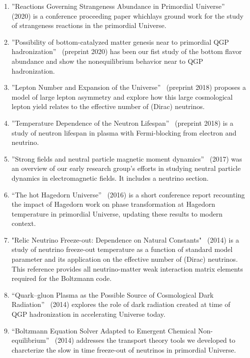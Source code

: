 \begin{enumerate}
%
\item ''Reactions Governing Strangeness Abundance in Primordial Universe''~\cite{Rafelski:2020ajx}  (2020) is a conference proceeding paper whichlays ground work for the study of strangeness reactions in the primordial Universe. 
%
\item''Possibility of bottom-catalyzed matter genesis near to primordial QGP hadronization''~\cite{Yang:2020nne} (preprint 2020) has been our fist study of the bottom flavor abundance and show the  nonequilibrium behavior near to QGP hadronization. 
%
\item ''Lepton Number and Expansion of the Universe''~\cite{Yang:2018oqg} (preprint 2018) proposes a model of large lepton asymmetry and explore how this large cosmological lepton yield
relates to the effective number of (Dirac) neutrinos.
%
\item''Temperature Dependence of the Neutron Lifespan''~\cite{Yang:2018qrr} (preprint 2018) is a study of neutron lifespan in plasma with Fermi-blocking from electron and neutrino. 
%
\item ''Strong fields and neutral particle magnetic moment dynamics''~\cite{Formanek:2017mbv} (2017) was an overview of our early research group's efforts in studying neutral particle dynamics in electromagnetic fields. It includes a neutrino section. 
%
\item ``The hot Hagedorn Universe''~\cite{Rafelski:2016cho} (2016) is a short conference report recounting the impact of Hagedorn work on phase transformation at Hagedorn temperature in primordial Universe, updating these results to modern context.
%
\item "Relic Neutrino Freeze-out: Dependence on Natural Constants"~\cite{Birrell:2014uka} (2014) is a study of neutrino freeze-out temperature as a function of standard model parameter and its application on the effective number of (Dirac) neutrinos. This reference provides all   neutrino-matter weak interaction matrix elements required for the Boltzmann code. 
%
\item ``Quark–gluon Plasma as the Possible Source of Cosmological Dark Radiation''~\cite{Birrell:2014cja} (2014) explores the role of dark radiation created at time of QGP hadronization in accelerating Universe today.
%
\item ``Boltzmann Equation Solver Adapted to Emergent Chemical Non-equilibrium''~\cite{Birrell:2014gea} (2014) addresses the transport theory tools we developed to charcterize the slow in time freeze-out of neutrinos in primordial Universe.

\end{enumerate}
